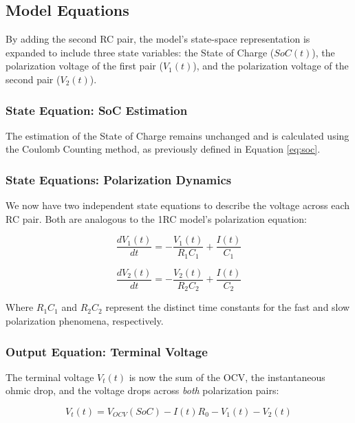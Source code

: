 \documentclass[]{article}
\begin{document}
\subsection{Model Equations}

By adding the second RC pair, the model's state-space representation is expanded to include three state variables: the State of Charge ($SoC(t)$), the polarization voltage of the first pair ($V_1(t)$), and the polarization voltage of the second pair ($V_2(t)$).

\subsubsection{State Equation: SoC Estimation}
The estimation of the State of Charge remains unchanged and is calculated using the Coulomb Counting method, as previously defined in Equation \ref{eq:soc}.

\subsubsection{State Equations: Polarization Dynamics}
We now have two independent state equations to describe the voltage across each RC pair. Both are analogous to the 1RC model's polarization equation:

\begin{equation}
	\label{eq:v1_2rc}
	\frac{dV_1(t)}{dt} = - \frac{V_1(t)}{R_1 C_1} + \frac{I(t)}{C_1}
\end{equation}

\begin{equation}
	\label{eq:v2_2rc}
	\frac{dV_2(t)}{dt} = - \frac{V_2(t)}{R_2 C_2} + \frac{I(t)}{C_2}
\end{equation}

Where $R_1 C_1$ and $R_2 C_2$ represent the distinct time constants for the fast and slow polarization phenomena, respectively.

\subsubsection{Output Equation: Terminal Voltage}
The terminal voltage $V_t(t)$ is now the sum of the OCV, the instantaneous ohmic drop, and the voltage drops across \textit{both} polarization pairs:

\begin{equation}
	\label{eq:vt_2rc}
	V_t(t) = V_{OCV}(SoC) - I(t)R_0 - V_1(t) - V_2(t)
\end{equation}
\end{document}
